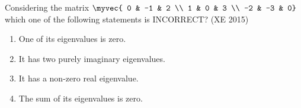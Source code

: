 \item Considering the matrix
$\myvec{ 0 & -1 & 2 \\ 1 & 0 & 3 \\ -2 & -3 & 0}$
which one of the following statements is INCORRECT?
\hfill{(XE 2015)} 
\begin{multicols}{2}
\begin{enumerate}
\item One of its eigenvalues is zero.
\item It has two purely imaginary eigenvalues.
\item It has a non-zero real eigenvalue.
\item The sum of its eigenvalues is zero.
\end{enumerate}
\end{multicols}



